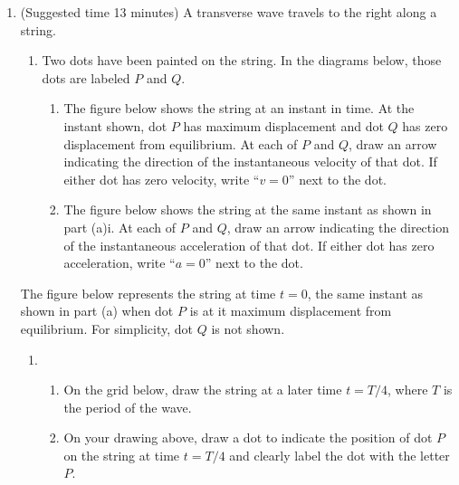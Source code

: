 \documentclass{../../../oss-apphys}
\begin{document}
\begin{enumerate}[leftmargin=15pt]
\item (Suggested time 13 minutes) A transverse wave travels to the right
  along a string.
  \begin{enumerate}[leftmargin=18pt]
  \item  Two dots have been painted on the string. In the diagrams below, those
    dots are labeled $P$ and $Q$.
    \begin{enumerate}[leftmargin=12pt]
    \item The figure below shows the string at an instant in time. At the
      instant shown, dot $P$ has maximum displacement and dot $Q$ has zero
      displacement from equilibrium. At each of $P$ and $Q$, draw an
      arrow indicating the direction of the instantaneous velocity of that dot.
      If either dot has zero velocity, write ``$v=0$'' next to the dot.
      \begin{center}
      \end{center}
    \item The figure below shows the string at the same instant as shown in
      part (a)i. At each of $P$ and $Q$, draw an arrow indicating the
      direction of the instantaneous acceleration of that dot. If either dot
      has zero acceleration, write ``$a=0$'' next to the dot.
      \begin{center}
      \end{center}
    \end{enumerate}
  \end{enumerate}
  The figure below represents the string at time $t=0$, the same instant as
  shown in part (a) when dot $P$ is at it maximum displacement from
  equilibrium. For simplicity, dot $Q$ is not shown.
  \begin{center}
  \end{center}
  \begin{enumerate}[leftmargin=18pt,resume]
  \item 
    \begin{enumerate}[leftmargin=18pt]
    \item On the grid below, draw the string at a later time $t=T/4$, where
      $T$ is the period of the wave.
      \begin{center}
  \end{center}
    \item On your drawing above, draw a dot to indicate the position of dot
      $P$ on the string at time $t=T/4$ and clearly label the dot with the
      letter $P$.
    \end{enumerate}
    \newpage
    

\end{enumerate}
\end{enumerate}
\end{document}
